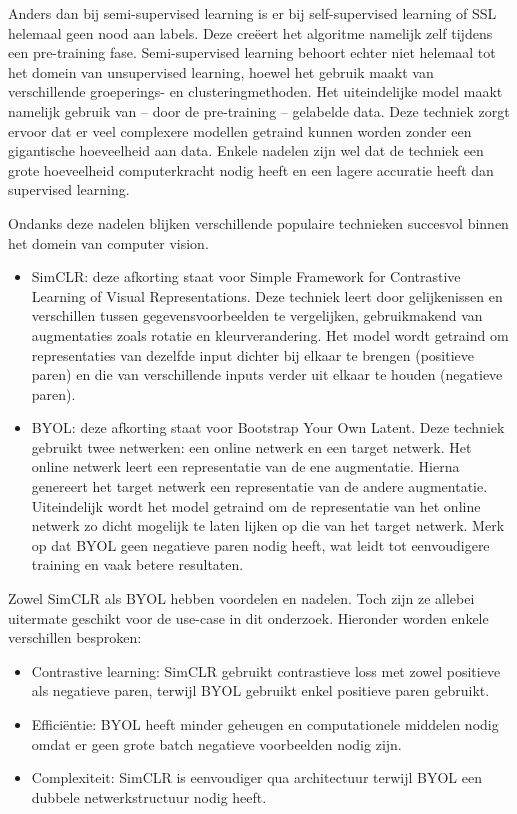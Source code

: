 Anders dan bij semi-supervised learning is er bij self-supervised learning of SSL helemaal geen nood aan labels. Deze creëert het algoritme namelijk zelf tijdens een pre-training fase. Semi-supervised learning behoort echter niet helemaal tot het domein van unsupervised learning, hoewel het gebruik maakt van verschillende groeperings- en clusteringmethoden. Het uiteindelijke model maakt namelijk gebruik van -- door de pre-training -- gelabelde data. Deze techniek zorgt ervoor dat er veel complexere modellen getraind kunnen worden zonder een gigantische hoeveelheid aan data. Enkele nadelen zijn wel dat de techniek een grote hoeveelheid computerkracht nodig heeft en een lagere accuratie heeft dan supervised learning. \autocite{Gui_2024}

Ondanks deze nadelen blijken verschillende populaire technieken succesvol binnen het domein van computer vision.

\begin{itemize}
    \item SimCLR: deze afkorting staat voor Simple Framework for Contrastive Learning of Visual Representations. Deze techniek leert door gelijkenissen en verschillen tussen gegevensvoorbeelden te vergelijken, gebruikmakend van augmentaties zoals rotatie en kleurverandering. Het model wordt getraind om representaties van dezelfde input dichter bij elkaar te brengen (positieve paren) en die van verschillende inputs verder uit elkaar te houden (negatieve paren). \autocite{Chen_2020}
    \item BYOL: deze afkorting staat voor Bootstrap Your Own Latent. Deze techniek gebruikt twee netwerken: een online netwerk en een target netwerk. Het online netwerk leert een representatie van de ene augmentatie. Hierna genereert het target netwerk een representatie van de andere augmentatie. Uiteindelijk wordt het model getraind om de representatie van het online netwerk zo dicht mogelijk te laten lijken op die van het target netwerk. Merk op dat BYOL geen negatieve paren nodig heeft, wat leidt tot eenvoudigere training en vaak betere resultaten. \autocite{Grill_2020}
\end{itemize}

Zowel SimCLR als BYOL hebben voordelen en nadelen. Toch zijn ze allebei uitermate geschikt voor de use-case in dit onderzoek. Hieronder worden enkele verschillen besproken:

\begin{itemize}
    \item Contrastive learning: SimCLR gebruikt contrastieve loss met zowel positieve als negatieve paren, 
    terwijl BYOL gebruikt enkel positieve paren gebruikt.
    \item Efficiëntie: BYOL heeft minder geheugen en computationele middelen nodig omdat er geen grote batch negatieve voorbeelden nodig zijn.
    \item Complexiteit: SimCLR is eenvoudiger qua architectuur terwijl BYOL een dubbele netwerkstructuur nodig heeft.
\end{itemize}

